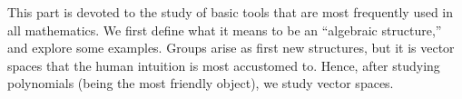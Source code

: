 \label{part:basicalgebra}

This part is devoted to the study of basic tools
that are most frequently used in all mathematics.
We first define what it means to be an ``algebraic structure,''
and explore some examples.
Groups arise as first new structures,
but it is vector spaces that the human intuition is most accustomed to.
Hence, after studying polynomials (being the most friendly object),
we study vector spaces.